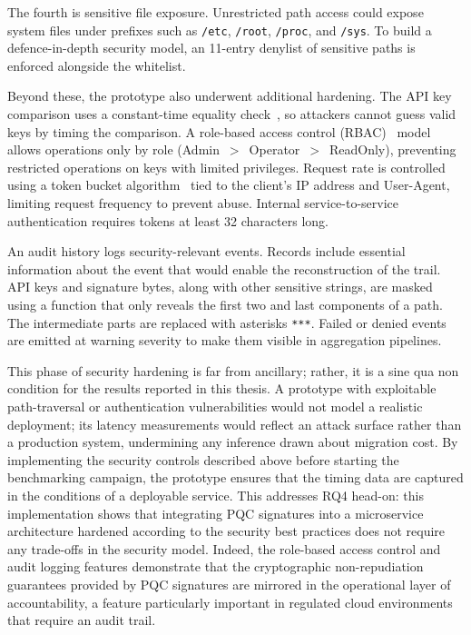 \documentclass[12pt,a4paper]{article}
\begin{document}
The fourth is sensitive file exposure. Unrestricted path access could expose system files under prefixes such as \texttt{/etc}, \texttt{/root}, \texttt{/proc}, and \texttt{/sys}. To build a defence-in-depth security model, an 11-entry denylist of sensitive paths is enforced alongside the whitelist.

Beyond these, the prototype also underwent additional hardening. The API key comparison uses a constant-time equality check~\cite{kocher1996timing}, so attackers cannot guess valid keys by timing the comparison. A role-based access control (RBAC)~\cite{sandhu1996rbac} model allows operations only by role (Admin~$>$~Operator~$>$~ReadOnly), preventing restricted operations on keys with limited privileges. Request rate is controlled using a token bucket algorithm~\cite{turner1986token} tied to the client’s IP address and User-Agent, limiting request frequency to prevent abuse. Internal service-to-service authentication requires tokens at least 32 characters long.

An audit history logs security-relevant events. Records include essential information about the event that would enable the reconstruction of the trail. API keys and signature bytes, along with other sensitive strings, are masked using a function that only reveals the first two and last components of a path. The intermediate parts are replaced with asterisks \texttt{***}. Failed or denied events are emitted at warning severity to make them visible in aggregation pipelines.

This phase of security hardening is far from ancillary; rather, it is a sine qua non condition for the results reported in this thesis. A prototype with exploitable path-traversal or authentication vulnerabilities would not model a realistic deployment; its latency measurements would reflect an attack surface rather than a production system, undermining any inference drawn about migration cost. By implementing the security controls described above before starting the benchmarking campaign, the prototype ensures that the timing data are captured in the conditions of a deployable service. This addresses RQ4 head-on: this implementation shows that integrating PQC signatures into a microservice architecture hardened according to the security best practices does not require any trade-offs in the security model. Indeed, the role-based access control and audit logging features demonstrate that the cryptographic non-repudiation guarantees provided by PQC signatures are mirrored in the operational layer of accountability, a feature particularly important in regulated cloud environments that require an audit trail.
\end{document}
